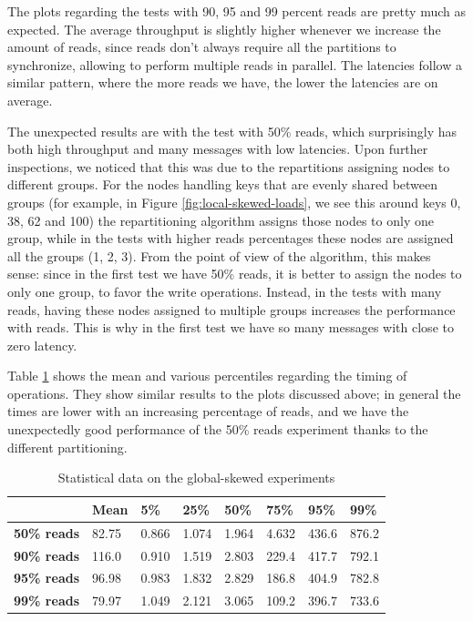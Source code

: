 The plots regarding the tests with 90, 95 and 99 percent reads are pretty much as expected. The average throughput is slightly higher whenever we increase the amount of reads, since reads don't always require all the partitions to synchronize, allowing to perform multiple reads in parallel. The latencies follow a similar pattern, where the more reads we have, the lower the latencies are on average.

The unexpected results are with the test with 50\% reads, which surprisingly has both high throughput and many messages with low latencies. Upon further inspections, we noticed that this was due to the repartitions assigning nodes to different groups. For the nodes handling keys that are evenly shared between groups (for example, in Figure \ref{fig:local-skewed-loads}, we see this around keys 0, 38, 62 and 100) the repartitioning algorithm assigns those nodes to only one group, while in the tests with higher reads percentages these nodes are assigned all the groups (1, 2, 3). From the point of view of the algorithm, this makes sense: since in the first test we have 50\% reads, it is better to assign the nodes to only one group, to favor the write operations. Instead, in the tests with many reads, having these nodes assigned to multiple groups increases the performance with reads. This is why in the first test we have so many messages with close to zero latency.

Table \ref{tab:local-latencies-table} shows the mean and various percentiles regarding the timing of operations. They show similar results to the plots discussed above; in general the times are lower with an increasing percentage of reads, and we have the unexpectedly good performance of the 50\% reads experiment thanks to the different partitioning.

\begin{table}[!htb]
  \centering
  \begin{tabular}{l l l l l l l l}
    \hline
    & \textbf{Mean} & \textbf{5\%} & \textbf{25\%} & \textbf{50\%} & \textbf{75\%} & \textbf{95\%}& \textbf{99\%} \\
    \hline
    \textbf{50\% reads} & 82.75 & 0.866 & 1.074 & 1.964 & 4.632 & 436.6 & 876.2 \\
    \textbf{90\% reads} & 116.0 & 0.910 & 1.519 & 2.803 & 229.4 & 417.7 & 792.1 \\
    \textbf{95\% reads} & 96.98 & 0.983 & 1.832 & 2.829 & 186.8 & 404.9 & 782.8 \\
    \textbf{99\% reads} & 79.97 & 1.049 & 2.121 & 3.065 & 109.2 & 396.7 &  733.6 \\
    \hline
  \end{tabular}
  \caption{Statistical data on the global-skewed experiments}\label{tab:local-latencies-table}
\end{table}


